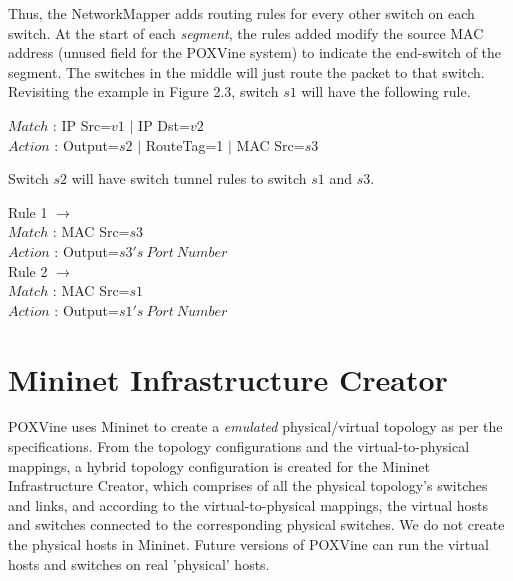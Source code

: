 Thus, the NetworkMapper adds routing rules for every other switch on each switch. At the start of each \emph{segment}, the rules added modify the source MAC address (unused field for the POXVine system) to indicate the end-switch of the segment. The switches in the middle will just route the packet to that switch. Revisiting the example in Figure 2.3, switch $s1$ will have the following rule. 
\begin{center}
	$Match$ : IP Src=$v1$ $|$ IP Dst=$v2$ \\
	$Action$ : Output=$s2$ $|$ RouteTag=1 $|$ MAC Src=$s3$\\
\end{center}

Switch $s2$ will have switch tunnel rules to switch $s1$ and $s3$. 
\begin{center}
	Rule 1 $\rightarrow$\\
	$Match$ : MAC Src=$s3$ \\
	$Action$ : Output=$s3's\ Port\ Number$ \\
	Rule 2 $\rightarrow$\\
	$Match$ : MAC Src=$s1$ \\
	$Action$ : Output=$s1's\ Port\ Number$ \\	
\end{center}

\section{Mininet Infrastructure Creator}
POXVine uses Mininet to create a \emph{emulated} physical/virtual topology as per the specifications. From the topology configurations and the virtual-to-physical mappings, a hybrid topology configuration is created for the Mininet Infrastructure Creator, which comprises of all the physical topology's switches and links, and according to the virtual-to-physical mappings, the virtual hosts and switches connected to the corresponding physical switches. We do not create the physical hosts in Mininet. Future versions of POXVine can run the virtual hosts and switches on real 'physical' hosts.






 

